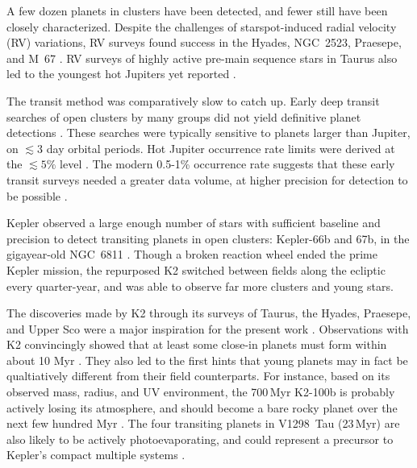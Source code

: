 \documentclass[12pt,twocolumn,tighten]{aastex62}
\begin{document}
A few dozen planets in clusters have been detected, and fewer still
have been closely characterized.  Despite the challenges of
starspot-induced radial velocity (RV) variations, RV surveys found
success in the Hyades, NGC~2523, Praesepe, and M~67
\citep{Sato_et_al_2007,lovis_mayor_2007,Quinn_et_al_2012,Malavolta_et_al_2016,brucalassi_search_2017}.
RV surveys of highly active pre-main sequence stars in Taurus also led
to the youngest hot Jupiters yet reported
\citep{donati_hj_2016,johns-krull_candidate_2016,biddle_k2_2018,flagg_co_2019}.

The transit method was comparatively slow to catch up.  Early deep
transit searches of open clusters by many groups did not yield
definitive planet detections
\citep{mochejska_planets_2005,mochejska_planets_2006,burke_survey_2006,aigrain_monitor_2007,irwin_monitordata_2007,miller_monitor_2008,pepper_photometric_2008,hartman_MMT_IV_2009}.
These searches were typically sensitive to planets larger than
Jupiter, on $\lesssim 3$ day orbital periods.  Hot Jupiter occurrence
rate limits were derived at the $\lesssim 5\%$ level \citep[{\it
e.g.},][]{burke_survey_2006,hartman_MMT_IV_2009}.  The modern 0.5-1\%
occurrence rate suggests that these early transit surveys needed a
greater data volume, at higher precision for detection to be possible
\citep{mayor_harps_2011,wright_frequency_2012,howard_planet_2012,petigura_metallicity_2018}.

Kepler observed a large enough number of stars with sufficient
baseline and precision to detect transiting planets in open clusters:
Kepler-66b and 67b, in the gigayear-old NGC~6811
\citep{borucki_kepler_2010,Meibom_et_al_2013}.  Though a broken
reaction wheel ended the prime Kepler mission, the repurposed K2
\citep{howell_k2_2014} switched between fields along the ecliptic
every quarter-year, and was able to observe far more clusters and
young stars.

The discoveries made by K2 through its surveys of Taurus, the Hyades,
Praesepe, and Upper Sco were a major inspiration for the present work
\citep[{\it
e.g.},][]{Mann_K2_25_2016,obermeier_k2_2016,Mann_et_al_2017,vanderburg_zeitVII_2018,ciardi_k2-136_2018,livingston_three_2018,mann_ZEITVI_2018,rizzuto_zeitVIII_2018,livingston_k2-264_2019}.
Observations with K2 convincingly showed that at least some close-in
planets must form within about 10 Myr
\citep{Mann_K2_33b_2016,David_et_al_2017}.  They also led to the first
hints that young planets may in fact be qualtiatively different from
their field counterparts.  For instance, based on its observed mass,
radius, and UV environment, the 700$\,$Myr K2-100b is probably
actively losing its atmosphere, and should become a bare rocky planet
over the next few hundred Myr
\citep{Mann_et_al_2017,barragan_radial_2019}.  The four transiting
planets in V1298~Tau (23$\,$Myr) are also likely to be actively
photoevaporating, and could represent a precursor to Kepler's compact
multiple systems \citep{david_four_2019,david_warm_2019}.
\end{document}
